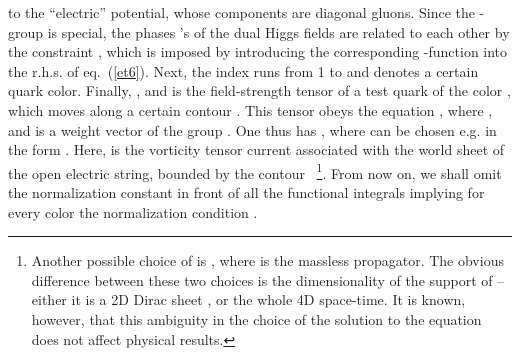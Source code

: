 \documentclass[a4paper,12pt]{article}
\begin{document}
to the ``electric'' potential, whose components are diagonal gluons.
Since the \coordHE{}-group is special, the phases \coordHE{}'s of the
dual Higgs fields are related to each other by the constraint
\coordHE{}, which is imposed by introducing
the corresponding \myHighlight{$\delta$}\coordHE{}-function into the r.h.s. of eq.~(\ref{et6}).
Next, the index \myHighlight{$\alpha$}\coordHE{} runs from 1 to \coordHE{} and denotes a certain quark color.
Finally, \coordHE{}, and
\coordHE{} is the field-strength tensor
of a test quark of the color \myHighlight{$\alpha$}\coordHE{}, which moves along a certain
contour \coordHE{}. This tensor obeys the equation
\coordHE{},
where \coordHE{},
and \coordHE{} is a weight vector of the group \coordHE{}.
One thus has \coordHE{},
where \coordHE{} can be chosen e.g. in the form
\coordHE{}.
Here, \coordHE{} is the vorticity tensor current associated
with the world sheet \myHighlight{$\Sigma$}\coordHE{} of
the open electric string, bounded by the contour \coordHE{}~\footnote{Another possible choice of \coordHE{}
is \coordHE{}, where \coordHE{}
is the massless propagator. The obvious difference between these two choices is the dimensionality of the support
of \coordHE{} -- either it is a 2D Dirac sheet \myHighlight{$\Sigma$}\coordHE{}, or the whole 4D space-time.
It is known, however, that this ambiguity in the choice of the solution to the equation \coordHE{}
does not affect physical results.}.
From now on, we shall omit the normalization constant in front of
all the functional integrals implying for every color \myHighlight{$\alpha$}\coordHE{} the normalization condition
\coordHE{}.
\end{document}

